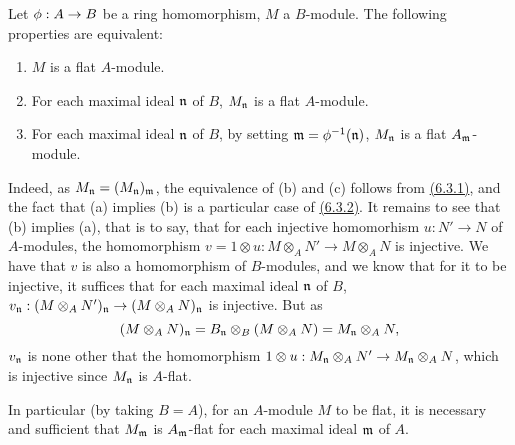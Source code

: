 \begin{env}[6.3.3]
\label{0.6.3.3}
Let $\phi:A\to B$ be a ring homomorphism, $M$ a $B$-module. The following
properties are equivalent:
\begin{enumerate}[label=(\alph*)]
  \item $M$ is a flat $A$-module.
  \item For each maximal ideal $\mathfrak{n}$ of $B$, $M_\mathfrak{n}$ is a flat $A$-module.
  \item For each maximal ideal $\mathfrak{n}$ of $B$, by setting
    $\mathfrak{m}=\phi^{-1}(\mathfrak{n})$, $M_\mathfrak{n}$ is a flat $A_\mathfrak{m}$-module.
\end{enumerate}

Indeed, as $M_\mathfrak{n}=(M_\mathfrak{n})_\mathfrak{m}$, the equivalence of
(b) and (c) follows from \hyperref[0.6.3.1]{(6.3.1)}, and the fact that (a) implies (b) is
a particular case of \hyperref[0.6.3.2]{(6.3.2)}. It remains to see that (b) implies (a),
that is to say, that for each injective homomorhism $u:N'\to N$ of $A$-modules, the
homomorphism $v=1\otimes u:M\otimes_A N'\to M\otimes_A N$ is injective. We have that $v$ is
also a homomorphism of $B$-modules, and we know that for it to be injective, it suffices that
for each maximal ideal $\mathfrak{n}$ of $B$,
$v_\mathfrak{n}:(M\otimes_A N')_\mathfrak{n}\to(M\otimes_A N)_\mathfrak{n}$ is injective. But
as
\[
  (M\otimes_A N)_\mathfrak{n}=B_\mathfrak{n}\otimes_B(M\otimes_A N)
  =M_\mathfrak{n}\otimes_A N,
\]
$v_\mathfrak{n}$ is none other that the homomorphism
$1\otimes u:M_\mathfrak{n}\otimes_A N'\to M_\mathfrak{n}\otimes_A N$, which is injective
since $M_\mathfrak{n}$ is $A$-flat.

In particular (by taking $B=A$), for an $A$-module $M$ to be flat, it is necessary and
sufficient that $M_\mathfrak{m}$ is $A_\mathfrak{m}$-flat for each maximal ideal
$\mathfrak{m}$ of $A$.
\end{env}

